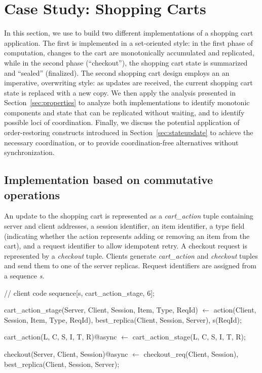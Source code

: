 \section{Case Study: Shopping Carts}
\label{sec:casestudy}

In this section, we use \lang to build two different implementations of a 
shopping cart application.
The first is implemented in a set-oriented style: in the first phase of computation,
changes to the cart are monotonically accumulated and replicated, while in the second
phase (``checkout''), the shopping cart state is summarized and ``sealed'' (finalized).
The second shopping cart design employs an
an imperative, overwriting style: as updates are received, the current shopping cart state
is replaced with a new copy.  We then apply the analysis presented in Section~\ref{sec:properties} 
to analyze both implementations to identify monotonic 
components and state that can be replicated without waiting, and to identify possible
loci of coordination.  Finally, we discuss the potential application of order-restoring
constructs introduced in Section~\ref{sec:stateupdate} to achieve the necessary coordination,
or to provide coordination-free alternatives without synchronization.


\subsection{Implementation based on commutative operations}
An update to the shopping cart is represented as a {\em cart\_action} tuple
containing server and client addresses, a session identifier, an item
identifier, a type field (indicating whether the action represents adding
or removing an item from the cart), and a request identifier to allow
idempotent retry. A checkout request is represented by a {\em checkout}
tuple.  Clients generate {\em cart\_action} and {\em checkout} tuples
and send them to one of the server replicas. Request identifiers are
assigned from a sequence {\em s}.

\begin{Dedalus}
// client code
sequence[s, cart_action_stage, 6];

cart_action_stage(Server, Client, Session,
                  Item, Type, ReqId) \(\leftarrow\)
    action(Client, Session, Item, Type, ReqId),
    best_replica(Client, Session, Server),
    s(ReqId);

cart_action(L, C, S, I, T, R)@async \(\leftarrow\)
    cart_action_stage(L, C, S, I, T, R);

checkout(Server, Client, Session)@async \(\leftarrow\)
    checkout_req(Client, Session),
    best_replica(Client, Session, Server);
\end{Dedalus}

